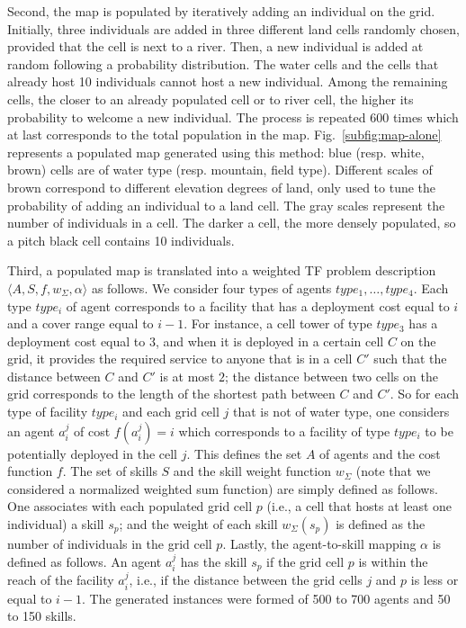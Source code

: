 \documentclass[conference]{IEEEtran}
\theoremstyle{definition}
\begin{document}
Second, the map is populated by iteratively adding an individual on the grid. 
Initially, three individuals are added in three different land cells randomly chosen,
provided that the cell is next to a river. Then, a new individual is added at 
random following a probability distribution.
The water cells and the cells that already host 10 individuals cannot host a new individual.
Among the remaining cells, the closer to an already populated cell or to river cell, 
the higher its probability to welcome a new individual.
The process is repeated 600 times which at last corresponds to the total 
population in the map. Fig.~\ref{subfig:map-alone} represents a populated map generated using 
this method: blue (resp. white, brown) cells are of water type (resp. mountain, field type). Different scales
of brown correspond to different elevation degrees of land, only 
used to tune the probability of adding an individual to a land cell.
The gray scales represent the number of individuals in a cell. 
The darker a cell, the more densely populated, so a pitch black cell contains 10 individuals.

Third, a populated map is translated into a weighted TF problem description
 $\langle A, S, f, w_\Sigma, \alpha\rangle$ as follows.
We consider four types of agents $type_1, \ldots, type_4$. 
Each type $type_i$ of agent corresponds to a facility that has a deployment cost
equal to $i$ and a cover range equal to $i - 1$. For instance, a cell tower 
of type $type_3$ has a deployment cost equal to $3$, and when it is
deployed in a certain cell $C$ on the grid, it provides the required service 
to anyone that is in a cell $C'$ such that the distance between
$C$ and $C'$ is at most $2$; the distance between two cells on the grid corresponds 
to the length of the shortest path
between $C$ and $C'$. So for each type of facility $type_i$ and each grid cell $j$ that is not of water type,
one considers an agent $a_i^j$ of cost $f(a_i^j) = i$ which corresponds to a 
facility of type $type_i$ to be potentially deployed in the cell $j$.
This defines the set $A$ of agents and the cost function $f$.
The set of skills $S$ and the skill weight function $w_\Sigma$ 
(note that we considered a normalized weighted sum function)
are simply defined as follows. One associates with each populated grid cell $p$ 
(i.e., a cell that hosts at least one individual) a skill $s_p$; and the weight 
of each skill $w_\Sigma(s_p)$ is defined as the number of individuals in the grid cell $p$.
Lastly, the agent-to-skill mapping $\alpha$ is defined as follows. An agent $a_i^j$ 
has the skill $s_p$ if the grid cell $p$ is within the reach of the facility $a_i^j$, 
i.e., if the distance between the grid cells $j$ and $p$ is less or equal to $i - 1$.
The generated instances were formed of 500 to 700 agents and 50 to 150 skills.
\end{document}
